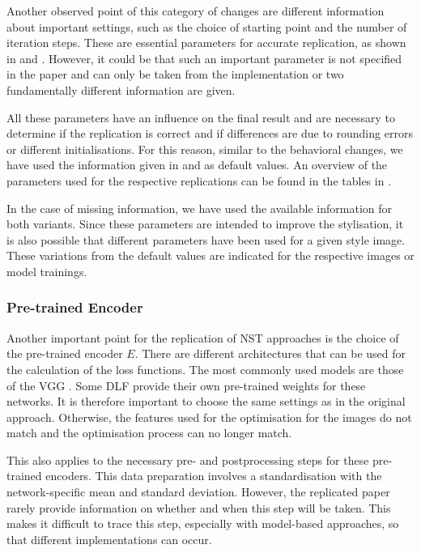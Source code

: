 Another observed point of this category of changes are different information about important settings, such as the choice of starting point and the number of iteration steps. These are essential parameters for accurate replication, as shown in  and . However, it could be that such an important parameter is not specified in the paper and can only be taken from the implementation or two fundamentally different information are given.  

All these parameters have an influence on the final result and are necessary to determine if the replication is correct and if differences are due to rounding errors or different initialisations. For this reason, similar to the behavioral changes, we have used the information given in \paper{} and \implementation{} as default values. An overview of the parameters used for the respective replications can be found in the tables in . 

In the case of missing information, we have used the available information for both variants. Since these parameters are intended to improve the stylisation, it is also possible that different parameters have been used for a given style image. These variations from the default values are indicated for the respective images or model trainings.

\subsubsection{Pre-trained Encoder}
Another important point for the replication of \gls{NST} approaches is the choice of the pre-trained encoder $E$. There are different architectures that can be used for the calculation of the loss functions. The most commonly used models are those of the \gls{VGG} \cite{SZ2015}. Some \gls{DLF} provide their own pre-trained weights for these networks. It is therefore important to choose the same settings as in the original approach. Otherwise, the features used for the optimisation for the images do not match and the optimisation process can no longer match.

This also applies to the necessary pre- and postprocessing steps for these pre-trained encoders. This data preparation involves a standardisation with the network-specific mean and standard deviation. However, the replicated paper rarely provide information on whether and when this step will be taken. This makes it difficult to trace this step, especially with model-based approaches, so that different implementations can occur.  

